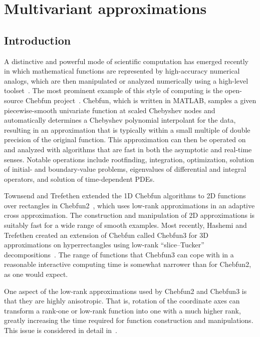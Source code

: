 \chapter{Multivariant approximations}

\section{Introduction}
\label{sec:introduction}

A distinctive and powerful mode of scientific computation has emerged recently in which mathematical functions are represented by high-accuracy numerical analogs, which are then manipulated or analyzed numerically using a high-level toolset~\cite{Trefethen2015}. The most prominent example of this style of computing is the open-source Chebfun project~\cite{battles2004extension,Driscoll2014}. Chebfun, which is written in MATLAB, samples a given piecewise-smooth univariate function at scaled Chebyshev nodes and automatically determines a Chebyshev polynomial interpolant for the data, resulting in an approximation that is typically within a small multiple of double precision of the original function. This approximation can then be operated on and analyzed with algorithms that are fast in both the asymptotic and real-time senses. Notable operations include rootfinding, integration, optimization, solution of initial- and boundary-value problems, eigenvalues of differential and integral operators, and solution of time-dependent PDEs.

Townsend and Trefethen extended the 1D Chebfun algorithms to 2D functions over rectangles in Chebfun2~\cite{townsend2013extension,Townsend2014}, which uses low-rank approximations in an adaptive cross approximation. The construction and manipulation of 2D approximations is suitably fast for a wide range of smooth examples. Most recently, Hashemi and Trefethen created an extension of Chebfun called Chebfun3 for 3D approximations on hyperrectangles using low-rank ``slice--Tucker'' decompositions~\cite{Hashemi2017}. The range of functions that Chebfun3 can cope with in a reasonable interactive computing time is somewhat narrower than for Chebfun2, as one would expect.

One aspect of the low-rank approximations used by Chebfun2 and Chebfun3 is that they are highly anisotropic. That is, rotation of the coordinate axes can transform a rank-one or low-rank function into one with a much higher rank, greatly increasing the time required for function construction and manipulations. This issue is considered in detail in~\cite{trefethen2017cubature}. 

